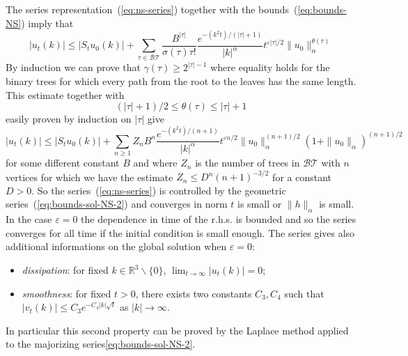 \documentclass[a4paper]{article}
\newcommand{\1}{{\bf 1}}
\newcommand{\eps}{\varepsilon}
\newcommand{\RR}{\mathbb{R}}
\newcommand{\BT}{\mathcal{BT}}
\newcommand{\RR}{\mathbb{R}}
\newcommand{\eps}{\varepsilon}
\begin{document}
\bigskip

The series representation~(\ref{eq:ns-series}) together with the
bounds~(\ref{eq:bounds-NS}) imply that
\begin{equation}
  \label{eq:bounds-sol-NS}
|u_t(k)| 
\le  |S_t u_0 (k)| + \sum_{\tau \in \BT}\frac{
  B^{|\tau|}}{\sigma(\tau) \tau!} \frac{e^{-(k^2 t)/(|\tau|+1)}}{|k|^\alpha} t^{\eps
  |\tau|/2} \|u_0\|_\alpha^{\theta(\tau)}   
\end{equation}
By induction we can prove that $\gamma(\tau) \ge 2^{|\tau|-1}$ where
equality holds for the binary trees for which every path from the root
to the leaves has the same length. This estimate together with
\begin{equation}
  \label{eq:theta-bound}
 (|\tau|+1)/2 \le
\theta(\tau) \le
|\tau|+1  
\end{equation}
easily proven by induction on $|\tau|$ give
\begin{equation}
  \label{eq:bounds-sol-NS-2}
|u_t(k)| 
\le  |S_t u_0 (k)| + \sum_{n \ge 1}
Z_n  B^{n}\frac{ e^{-(k^2 t)/(n+1)}}{|k|^\alpha} t^{\eps
 n/2} \|u_0\|_\alpha^{(n+1)/2} (1+\|u_0\|_\alpha)^{(n+1)/2}   
\end{equation}
for some different constant $B$ and where $Z_n$ is the number of trees
in $\BT$ with $n$ vertices for which we have the estimate
$
Z_n \le D^n (n+1)^{-3/2}
$ for a constant $D>0$. So the series~(\ref{eq:ns-series}) is
controlled by the geometric series~(\ref{eq:bounds-sol-NS-2}) and converges
in norm $t$ is small or $\|h\|_\alpha$ is small. In the case $\eps =
0$ the dependence in time of the r.h.s. is bounded and so the series
converges for all time if the initial condition is small enough.
The series gives also additional informations on the global solution
when $\eps =0$:
\begin{itemize}
\item[a)]  \emph{dissipation}: for fixed $k \in \RR^3\backslash \{0\}$, $
\lim_{t \to \infty } |u_t(k)| = 0  $;
\item[b)] \emph{smoothness}: for fixed $t > 0$, there exists two constants $C_3,C_4$ such that
 $|v_t(k)| \le C_3 e^{-C_4 |k|\sqrt{t}}$ as $|k| \to \infty$.
\end{itemize}
In particular this second property can be proved by the Laplace method applied to the majorizing series\ref{eq:bounds-sol-NS-2}.
\end{document}
